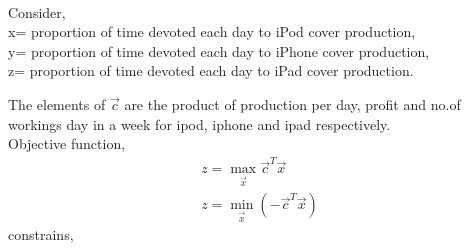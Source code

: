 \documentclass[journal,12pt,twocolumn]{IEEEtran}
\begin{document}
\begin{enumerate}
\solution \\
Consider,\\
x= proportion of time devoted each day to iPod cover production,\\
y= proportion of time devoted each day to iPhone cover production,\\
z= proportion of time devoted each day to iPad cover production.\\
\begin{table}[H]
 \centering
 \caption{}
 \end{table}
 The elements of $ \vec{c}$ are the product of production per day, profit and no.of workings day in a week for ipod, iphone and ipad respectively.\\
Objective function,
\begin{align}
z = \max_\vec{x} \vec{c}^T\vec{x}\\
z = \min_\vec{x} (- \vec{c}^T\vec{x})
\end{align}
constrains,

\end{enumerate}
\end{document}
